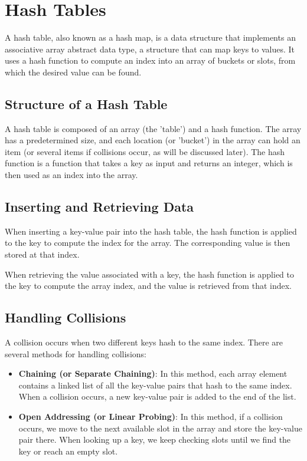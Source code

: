 \chapter{Hash Tables}

A hash table, also known as a hash map, is a data structure that implements an associative array abstract data type, a structure that can map keys to values. It uses a hash function to compute an index into an array of buckets or slots, from which the desired value can be found.

\section{Structure of a Hash Table}

A hash table is composed of an array (the 'table') and a hash function. The array has a predetermined size, and each location (or 'bucket') in the array can hold an item (or several items if collisions occur, as will be discussed later). The hash function is a function that takes a key as input and returns an integer, which is then used as an index into the array.

\section{Inserting and Retrieving Data}

When inserting a key-value pair into the hash table, the hash function is applied to the key to compute the index for the array. The corresponding value is then stored at that index. 

When retrieving the value associated with a key, the hash function is applied to the key to compute the array index, and the value is retrieved from that index.

\section{Handling Collisions}

A collision occurs when two different keys hash to the same index. There are several methods for handling collisions:

\begin{itemize}
    \item \textbf{Chaining (or Separate Chaining)}: In this method, each array element contains a linked list of all the key-value pairs that hash to the same index. When a collision occurs, a new key-value pair is added to the end of the list.
    \item \textbf{Open Addressing (or Linear Probing)}: In this method, if a collision occurs, we move to the next available slot in the array and store the key-value pair there. When looking up a key, we keep checking slots until we find the key or reach an empty slot.
\end{itemize}

